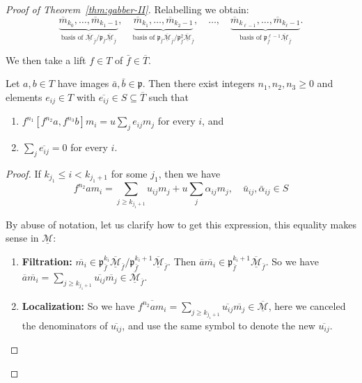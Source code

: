 \begin{proof}[Proof of Theorem~\ref{thm:gabber-II}]
	Relabelling we obtain:
	\[
		\underbrace{\overline m_{k_0},\dots,\overline m_{k_1-1}}_{\text{basis of }\overline{\underline{\mathcal M}}_{\bar f}/\mathfrak p_{\bar f}\overline{\underline{\mathcal M}}_{\bar f}},\quad
		\underbrace{\overline m_{k_1},\dots,\overline m_{k_2-1}}_{\text{basis of }\mathfrak p_{\bar f}\overline{\underline{\mathcal M}}_{\bar f}/\mathfrak p_{\bar f}^2\overline{\underline{\mathcal M}}_{\bar f}},\quad
		\ldots,\quad
		\underbrace{\overline m_{k_{\ell-1}},\dots,\overline m_{k_\ell-1}}_{\text{basis of }\mathfrak p_{\bar f}^{\ell-1}\overline{\underline{\mathcal M}}_{\bar f}}.
	\]

	We then take a lift $f\in T$ of $\bar f\in \overline T$.

	\begin{lemma}[Lemma~6.12]\label{lem:matrix}
		Let $a,b\in T$ have images $\bar a,\bar b\in \mathfrak p$. Then there exist integers
		$n_1,n_2,n_3\ge0$ and elements $e_{ij}\in T$ with $\overline{e_{ij}} \in S\subseteq \overline{T}$ such that
		\begin{enumerate}
			\item $f^{n_1}[f^{n_2}a,f^{n_3}b] m_i = u\sum_j e_{ij} m_j$ for every $i$, and
			\item $\sum_j \overline{e_{ij}} = 0$ for every $i$.
		\end{enumerate}
	\end{lemma}
	\begin{proof}
		If $k_{j_1} \le i < k_{j_1+1}$ for some $j_1$, then we have
		\[
			f^{n_2} a m_i = \sum_{j \ge k_{j_1+1}} u_{ij} m_j + u \sum_j \alpha_{ij} m_j,\quad \bar{u}_{ij}, \bar{\alpha}_{ij} \in S
		\]


		\begin{remark}
			By abuse of notation, let us clarify how to get this expression, this equality makes sense in $\underline{\mathcal{M}}$:

			\begin{enumerate}
				\item \textbf{Filtration:}
				      $\overline{m_i} \in \mathfrak{p}^{k_i}_{\bar f}\overline{\underline{\mathcal{M}}}_{\bar f}/\mathfrak{p}^{k_i+1}_{\bar f}\overline{\underline{\mathcal{M}}}_{\bar f}$. Then $\overline{a}\overline{m_i} \in \mathfrak{p}^{k_i+1}_{\bar f}\overline{\underline{\mathcal{M}}}_{\bar f}$. So we have $\overline{a}\overline{m_i} = \sum_{j \ge k_{j_1+1}} \overline{u_{ij}}\overline{m_j} \in \overline{\underline{\mathcal{M}}}_{\bar f}$.

				\item \textbf{Localization:}
				      So we have $\overline{f^{n_2} a m_i} = \sum_{j \ge k_{j_1+1}} \overline{u_{ij}} \overline{m_j} \in \overline{\underline{\mathcal{M}}}$, here we canceled the denominators of $\overline{u_{ij}}$, and use the same symbol to denote the new $\overline{u_{ij}}$.


\end{enumerate}
\end{remark}
\end{proof}
\end{proof}
